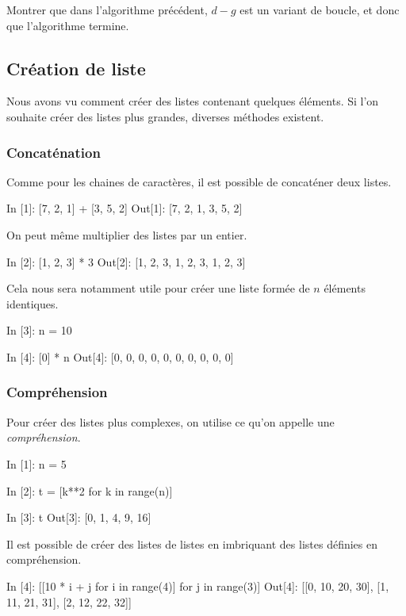 \documentclass{magnoliaold}
\begin{document}
\begin{exoUnique}
\exo Montrer que dans l'algorithme précédent, $d-g$ est un variant de boucle, et donc que l'algorithme
  termine.
\end{exoUnique}

\subsection{Création de liste}

Nous avons vu comment créer des listes contenant quelques éléments.  Si l'on souhaite
créer des listes plus grandes, diverses méthodes existent.

\subsubsection{Concaténation}
Comme pour les chaines de caractères, il est possible de concaténer deux listes.

\begin{pythoncode}
In [1]: [7, 2, 1] + [3, 5, 2]
Out[1]: [7, 2, 1, 3, 5, 2]
\end{pythoncode}

\noindent
On peut même multiplier des listes par un entier.

\begin{pythoncode}
In [2]: [1, 2, 3] * 3
Out[2]: [1, 2, 3, 1, 2, 3, 1, 2, 3]
\end{pythoncode}

\noindent
Cela nous sera notamment utile pour créer une liste formée de $n$ éléments identiques.

\begin{pythoncode}
In [3]: n = 10

In [4]: [0] * n
Out[4]: [0, 0, 0, 0, 0, 0, 0, 0, 0, 0]
\end{pythoncode}

\subsubsection{Compréhension}
Pour créer des listes plus complexes, on utilise ce qu'on appelle une \emph{compréhension}.

\begin{pythoncode}
In [1]: n = 5

In [2]: t = [k**2 for k in range(n)]

In [3]: t
Out[3]: [0, 1, 4, 9, 16]   
\end{pythoncode}
\noindent
Il est possible de créer des listes de listes en imbriquant des listes définies en compréhension.
\begin{pythoncode}
In [4]: [[10 * i + j for i in range(4)] for j in range(3)]
Out[4]: [[0, 10, 20, 30], [1, 11, 21, 31], [2, 12, 22, 32]]
\end{pythoncode}
\end{document}
